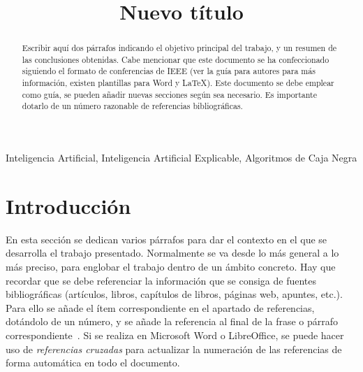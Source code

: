 \documentclass[conference,a4paper]{IEEEtran}
\begin{document}
\title{Nuevo título}

\author{
  
  \and
  
}

\maketitle


\begin{abstract}
  Escribir aquí dos párrafos indicando el objetivo principal del trabajo, y un
  resumen de las conclusiones obtenidas. Cabe mencionar que este documento se
  ha confeccionado siguiendo el formato de conferencias de IEEE (ver la guía
  para autores para más información, existen plantillas para Word y \LaTeX).
  Este documento se debe emplear como guía, se pueden añadir nuevas secciones
  según sea necesario. Es importante dotarlo de un número razonable de
  referencias bibliográficas.
\end{abstract}


\begin{IEEEkeywords}
  Inteligencia Artificial, Inteligencia Artificial Explicable, Algoritmos de Caja Negra
\end{IEEEkeywords}


\section{Introducción}

En esta sección se dedican varios párrafos para dar el contexto en el que se
desarrolla el trabajo presentado. Normalmente se va desde lo más general a lo
más preciso, para englobar el trabajo dentro de un ámbito concreto. Hay que
recordar que se debe referenciar la información que se consiga de fuentes
bibliográficas (artículos, libros, capítulos de libros, páginas web, apuntes,
etc.). Para ello se añade el ítem correspondiente en el apartado de
referencias, dotándolo de un número, y se añade la referencia al final de la
frase o párrafo correspondiente~\cite{b1}. Si se realiza en Microsoft Word o
LibreOffice, se puede hacer uso de \emph{referencias cruzadas} para actualizar
la numeración de las referencias de forma automática en todo el documento.
\end{document}
